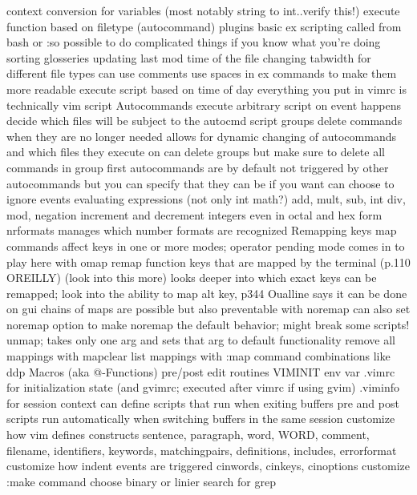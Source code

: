 \documentclass[12pt]{book}
\begin{document}
{{    context conversion for variables (most notably string to int..verify this!)
    execute function based on filetype (autocommand)
    plugins
    basic ex scripting called from bash or :so
      possible to do complicated things if you know what you're doing
        sorting glosseries
        updating last mod time of the file
        changing tabwidth for different file types
      can use comments
      use spaces in ex commands to make them more readable
    execute script based on time of day
    everything you put in vimrc is technically vim script
    Autocommands
      execute arbitrary script on event happens
      decide which files will be subject to the autocmd script
      groups
      delete commands when they are no longer needed
        allows for dynamic changing of autocommands and which files they execute on
      can delete groups but make sure to delete all commands in group first
      autocommands are by default not triggered by other autocommands but you can specify that they can be if you want
      can choose to ignore events
    evaluating expressions (not only int math?)
      add, mult, sub, int div, mod, negation
    increment and decrement integers even in octal and hex form
      nrformats manages which number formats are recognized
  Remapping keys
    map commands affect keys in one or more modes; operator pending mode comes in to play here with omap
    remap function keys that are mapped by the terminal (p.110 OREILLY) (look into this more)
      looks deeper into which exact keys can be remapped; look into the ability to map alt key, p344 Oualline says it can be done on gui
    chains of maps are possible but also preventable with noremap
      can also set noremap option to make noremap the default behavior; might break some scripts!
    unmap; takes only one arg and sets that arg to default functionality
    remove all mappings with mapclear
    list mappings with :map
  command combinations like ddp
  Macros (aka @-Functions)
  pre/post edit routines
    VIMINIT env var
    .vimrc for initialization state (and gvimrc; executed after vimrc if using gvim)
    .viminfo for session context
    can define scripts that run when exiting buffers
    pre and post scripts run automatically when switching buffers in the same session
  customize how vim defines constructs
    sentence, paragraph, word, WORD, comment, filename, identifiers, keywords, matchingpairs, definitions, includes, errorformat
  customize how indent events are triggered
    cinwords, cinkeys, cinoptions
  customize :make command
  choose binary or linier search for grep
}}
\end{document}
